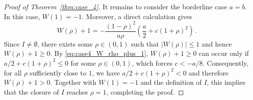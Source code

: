 \documentclass[10pt]{article}
\theoremstyle{definition}
\theoremstyle{definition}
\numberwithin{equation}{section}
\begin{document}
\begin{proof}[Proof of Theorem~\ref{thm:case_4}]
It remains to consider the borderline case $a = b$.
In this case, $W(1) = -1$.
Moreover, a direct calculation gives
\begin{equation}\label{eq:case4_W_rho_plus_1}
W(\rho) + 1 = - \frac{(1-\rho)^2}{a \rho} \left( \frac{a}{2} + c(1 + \rho)^2 \right) \, .
\end{equation}
Since $I \neq \emptyset$, there exists some $\rho \in (0,1)$ such that $|W(\rho)| \leq 1$ and hence $W(\rho) + 1 \geq 0$.
By \eqref{eq:case4_W_rho_plus_1}, $W(\rho) + 1 \geq 0$ can occur only if $a/2 + c(1 + \rho)^2 \leq 0$ for some $\rho \in (0,1)$, which forces $c < -a/8$.
Consequently, for all $\rho$ sufficiently close to $1$, we have $a/2 + c(1+\rho)^2 < 0$ and therefore $W(\rho) + 1 > 0$.
Together with $W(1) = -1$ and the definition of $I$, this implies that the closure of $I$ reaches $\rho=1$, completing the proof.



\end{proof}
\end{document}
